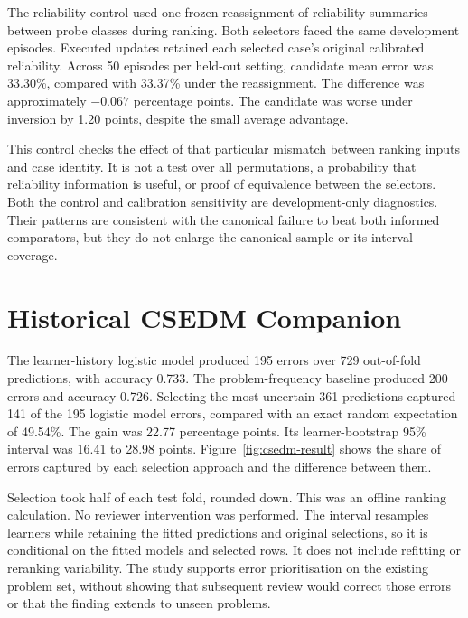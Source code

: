The reliability control used one frozen reassignment of reliability summaries between probe classes during ranking. Both
selectors faced the same development episodes. Executed updates retained each selected case's original calibrated reliability.
Across 50 episodes per held-out setting, candidate mean error was 33.30\%, compared with 33.37\% under the reassignment.
The difference was approximately $-0.067$ percentage points. The candidate was worse under inversion by 1.20 points, despite
the small average advantage.

This control checks the effect of that particular mismatch between ranking inputs and case identity. It is not a test over all
permutations, a probability that reliability information is useful, or proof of equivalence between the selectors. Both the
control and calibration sensitivity are development-only diagnostics. Their patterns are consistent with the canonical failure
to beat both informed comparators, but they do not enlarge the canonical sample or its interval coverage.

\FloatBarrier
\section{Historical CSEDM Companion}
\suppressfloats[t]

The learner-history logistic model produced 195 errors over 729 out-of-fold predictions, with accuracy 0.733. The problem-frequency
baseline produced 200 errors and accuracy 0.726. Selecting the most uncertain 361 predictions captured 141 of the 195 logistic
model errors, compared with an exact random expectation of 49.54\%. The gain was 22.77 percentage points. Its learner-bootstrap
95\% interval was 16.41 to 28.98 points. Figure~\ref{fig:csedm-result} shows the share of errors captured by each selection
approach and the difference between them.

Selection took half of each test fold, rounded down. This was an offline ranking calculation. No reviewer intervention was
performed. The interval resamples learners while retaining the fitted predictions and original selections, so it is conditional
on the fitted models and selected rows. It does not include refitting or reranking variability. The study supports error
prioritisation on the existing problem set, without showing that subsequent review would correct those errors or that the
finding extends to unseen problems.



